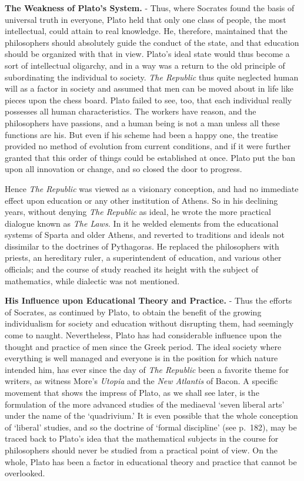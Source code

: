 \documentclass[]{book}
\begin{document}
\textbf{The Weakness of Plato's System.} - Thus, where Socrates found the basis of universal truth in everyone, Plato held that only one class of people, the most intellectual, could attain to real knowledge. He, therefore, maintained that the philosophers should absolutely guide the conduct of the state, and that education should be organized with that in view. Plato's ideal state would thus become a sort of intellectual oligarchy, and in a way was a return to the old principle of subordinating the individual to society. \emph{The Republic} thus quite neglected human will as a factor in society and assumed that men can be moved about in life like pieces upon the chess board. Plato failed to see, too, that each individual really possesses all human characteristics. The workers have reason, and the philosophers have passions, and a human being is not a man unless all these functions are his. But even if his scheme had been a happy one, the treatise provided no method of evolution from current conditions, and if it were further granted that this order of things could be established at once. Plato put the ban upon all innovation or change, and so closed the door to progress.

Hence \emph{The Republic} was viewed as a visionary conception, and had no immediate effect upon education or any other institution of Athens. So in his declining years, without denying \emph{The Republic} as ideal, he wrote the more practical dialogue known as \emph{The Laws.} In it he welded elements from the educational systems of Sparta and older Athens, and reverted to traditions and ideals not dissimilar to the doctrines of Pythagoras. He replaced the philosophers with priests, an hereditary ruler, a superintendent of education, and various other officials; and the course of study reached its height with the subject of mathematics, while dialectic was not mentioned.

\textbf{His Influence upon Educational Theory and Practice.} - Thus the efforts of Socrates, as continued by Plato, to obtain the benefit of the growing individualism for society and education without disrupting them, had seemingly come to naught. Nevertheless, Plato has had considerable influence upon the thought and practice of men since the Greek period. The ideal society where everything is well managed and everyone is in the position for which nature intended him, has ever since the day of \emph{The Republic} been a favorite theme for writers, as witness More's \emph{Utopia} and the \emph{New Atlantis} of Bacon. A specific movement that shows the impress of Plato, as we shall see later, is the formulation of the more advanced studies of the mediaeval `seven liberal arts' under the name of the `quadrivium.' It is even possible that the whole conception of `liberal' studies, and so the doctrine of `formal discipline' (see p.~182), may be traced back to Plato's idea that the mathematical subjects in the course for philosophers should never be studied from a practical point of view. On the whole, Plato has been a factor in educational theory and practice that cannot be overlooked.
\end{document}
